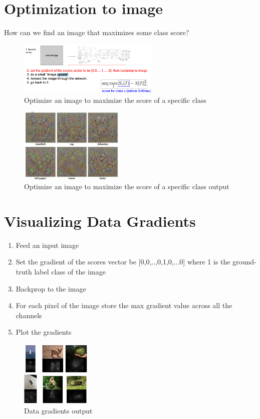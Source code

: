 \section{Optimization to image}
How can we find an image that maximizes some class score?
\begin{figure}[h]
  \centering
  \includegraphics[width=0.6\textwidth]{Images/visualization/9.png}
  \caption{Optimize an image to maximize the score of a specific class}
\end{figure}

\begin{figure}[h]
  \centering
  \includegraphics[width=0.45\textwidth]{Images/visualization/10.png}
  \caption{Optimize an image to maximize the score of a specific class output}
\end{figure}


\section{Visualizing Data Gradients}
\begin{enumerate}
\item Feed an input image
\item Set the gradient of the scores vector be [0,0,..,0,1,0,...0] where 1 is the ground-truth label class of the image
\item Backprop to the image
\item For each pixel of the image store the max gradient value across all the channels
\item Plot the gradients
\end{enumerate}

\begin{figure}[h]
  \centering
  \includegraphics[width=0.3\textwidth]{Images/visualization/11.png}
  \caption{Data gradients output}
\end{figure}


